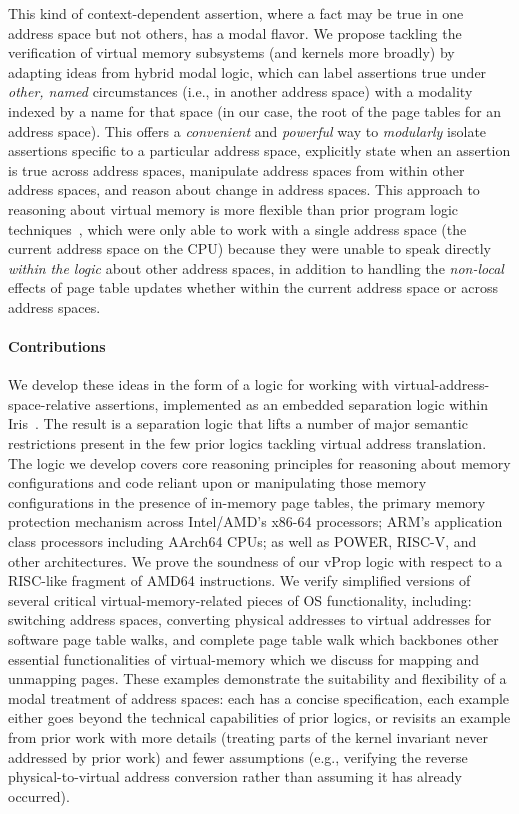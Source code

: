 This kind of context-dependent assertion, where a fact may be true in one address space but not others, has a modal flavor. 
We propose tackling the verification of virtual memory subsystems (and kernels more broadly) by adapting ideas from hybrid
modal logic, which can label assertions true under \emph{other, named} circumstances (i.e., in another address space) with a 
modality indexed by a name for that space (in our case, the root of the page tables for an address space). This offers a 
\textit{convenient} and \textit{powerful} way to \emph{modularly}
isolate assertions specific to a particular address space,
explicitly state when an assertion is true across address spaces,
manipulate address spaces from within other address spaces, and
reason about change in address spaces.
This approach to reasoning about virtual memory is more flexible than prior program logic techniques~\cite{kolanski08vstte,kolanski09tphols}, 
which were only able to work with a single address space (the current address space on the CPU) because they were unable
to speak directly \emph{within the logic} about other address spaces, in addition to handling
the \emph{non-local} effects of page table updates whether within the current address space or across address spaces.

\paragraph{Contributions}
We develop these ideas in the form of a logic for working with virtual-address-space-relative assertions,
implemented as an embedded separation logic within Iris~\cite{jung2018iris}.
The result is a separation logic that lifts a number of major semantic restrictions present in the few
prior logics tackling virtual address translation.
The logic we develop covers core reasoning principles for reasoning about memory configurations and code
reliant upon or manipulating those memory configurations in the presence of in-memory page tables, the primary
memory protection mechanism across Intel/AMD's x86-64 processors; ARM's application class processors including
AArch64 CPUs; as well as POWER, RISC-V, and other architectures.
We prove the soundness of our \textsf{vProp} logic with respect to a RISC-like fragment of \textsf{AMD64} instructions.
We verify simplified versions of several critical virtual-memory-related pieces of OS functionality, 
including:
switching address spaces, converting physical addresses to virtual addresses for
software page table walks, and complete page table walk which backbones other essential functionalities of
virtual-memory which we discuss for mapping and unmapping pages. These examples demonstrate the suitability and flexibility of
a modal treatment of address spaces: each has a concise specification, each example either goes beyond the technical
capabilities of prior logics, or revisits an example from prior work with more details (treating parts of the kernel
invariant never addressed by prior work) and fewer assumptions (e.g., verifying the reverse physical-to-virtual 
address conversion rather than assuming it has already occurred).

